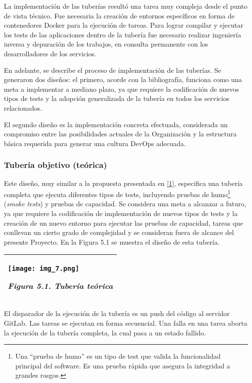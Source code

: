 La implementación de las tuberías resultó una tarea muy compleja desde el punto de vista técnico. Fue necesaria la creación de entornos específicos en forma de contenedores Docker para la ejecución de tareas. Para lograr compilar y ejecutar los tests de las aplicaciones dentro de la tubería fue necesario realizar ingeniería inversa y depuración de los trabajos, en consulta permanente con los desarrolladores de los servicios.

En adelante, se describe el proceso de implementación de las tuberías. Se generaron dos diseños: el primero, acorde con la bibliografía,  funciona como una meta a implementar a mediano plazo, ya que requiere la codificación de nuevos tipos de tests y la adopción generalizada de la tubería en todos los servicios relacionados.

El segundo diseño es la implementación concreta efectuada, considerada un compromiso entre las posibilidades actuales de la Organización y la estructura básica requerida para generar una cultura DevOps adecuada.

\subsubsection{Tubería objetivo (teórica)}

Este diseño, muy similar a la propuesta presentada en \href{https://www.zotero.org/google-docs/?lBK1S4}{[1]}, especifica una tubería completa que ejecuta diferentes tipos de tests, incluyendo pruebas de humo\footnote{ Una “prueba de humo” es un tipo de test que valida la funcionalidad principal del software. Es una prueba rápida que asegura la integridad a grandes rasgos.} (\textit{smoke tests}) y pruebas de capacidad. Se considera una meta a alcanzar a futuro, ya que requiere la codificación de implementación de nuevos tipos de tests y la creación de un nuevo entorno para ejecutar las pruebas de capacidad, tareas que conllevan un cierto grado de complejidad y se consideran fuera de alcance del presente Proyecto. En la Figura 5.1 se muestra el diseño de esta tubería.

\begin{tabular}{|l|}
\hline
\texttt{[image: img\_7.png]}


\textit{Figura 5.1. Tubería teórica} \\ \hline
\end{tabular}
El disparador de la ejecución de la tubería es un push del código al servidor GitLab. Las tareas se ejecutan en forma secuencial. Una falla en una tarea aborta la ejecución de la tubería completa, la cual pasa a un estado fallido.

